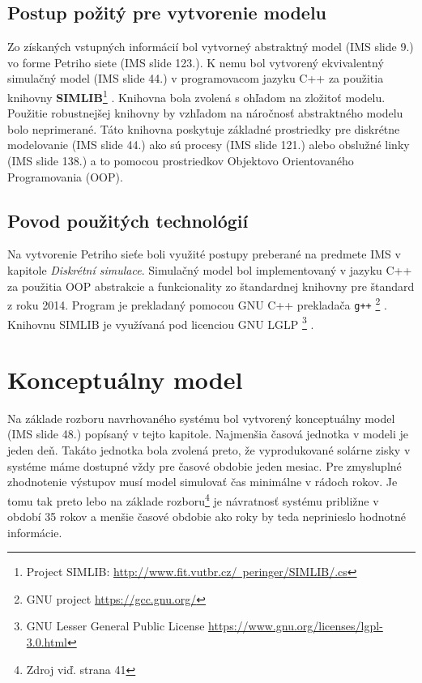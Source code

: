 \documentclass[a4paper, 11pt]{article}
\begin{document}
\subsection{Postup požitý pre vytvorenie modelu}

Zo získaných vstupných informácií bol vytvorneý abstraktný model (IMS\cite{ims_slides} slide 9.) vo forme Petriho siete (IMS\cite{ims_slides} slide 123.). K nemu bol vytvorený ekvivalentný simulačný model (IMS\cite{ims_slides} slide 44.) v programovacom jazyku C++ za použitia knihovny \textbf{SIMLIB}\footnote{Project SIMLIB: \href{http://www.fit.vutbr.cz/~peringer/SIMLIB/.cs}{http://www.fit.vutbr.cz/~peringer/SIMLIB/.cs}} . Knihovna bola zvolená s ohľadom na zložitoť modelu. Použitie robustnejšej knihovny by vzhľadom na náročnosť abstraktného modelu bolo neprimerané. Táto knihovna poskytuje základné prostriedky pre diskrétne modelovanie (IMS\cite{ims_slides} slide 44.) ako sú procesy (IMS\cite{ims_slides} slide 121.) alebo obslužné linky (IMS\cite{ims_slides} slide 138.) a to pomocou prostriedkov Objektovo Orientovaného Programovania (OOP).

\subsection{Povod použitých technológií}
Na vytvorenie Petriho sieťe boli využité postupy preberané na predmete IMS\cite{ims_slides} v kapitole \textit{Diskrétní simulace}. Simulačný model bol implementovaný v jazyku C++ za použitia OOP abstrakcie a funkcionality zo štandardnej knihovny pre štandard z roku 2014. Program je prekladaný pomocou GNU C++ prekladača \texttt{g++} \footnote{GNU project \href{https://gcc.gnu.org/}{https://gcc.gnu.org/}} . Knihovnu SIMLIB  je využívaná pod licenciou GNU LGLP \footnote{GNU Lesser General Public License \href{https://www.gnu.org/licenses/lgpl-3.0.html}{https://www.gnu.org/licenses/lgpl-3.0.html}} . 

\section{Konceptuálny model}
Na základe rozboru navrhovaného systému bol vytvorený konceptuálny model (IMS\cite{ims_slides} slide 48.) popísaný v tejto kapitole.  Najmenšia časová jednotka v modeli je jeden deň. Takáto jednotka bola zvolená preto, že vyprodukované solárne zisky v systéme máme dostupné vždy pre časové obdobie jeden mesiac. Pre zmysluplné zhodnotenie výstupov musí model simulovať čas minimálne v rádoch rokov. Je tomu tak preto lebo na základe rozboru\footnote{Zdroj\cite{bc_solar_system} viď. strana 41} je návratnosť systému približne v období 35 rokov a menšie časové obdobie ako roky by teda neprinieslo hodnotné informácie. 
\end{document}
